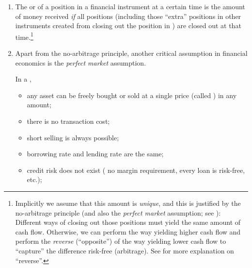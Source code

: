 \begin{enumerate}
\item The  or  of a position in a financial instrument
 at a certain time is the amount of money 
received \emph{if} all positions (including those ``extra'' positions in other
instruments created from closing out the position in ) are
closed out at that time.\footnote{Implicitly we assume that this amount is
\emph{unique}, and this is justified by the no-arbitrage principle (and also
the \emph{perfect market} assumption; see ):
Different ways of closing out those positions must yield the same amount of
cash flow.  Otherwise, we can perform the way yielding higher cash flow and
perform the \emph{reverse} (``opposite'') of the way yielding lower cash flow
to ``capture'' the difference risk-free (arbitrage). See 
for more explanation on ``reverse''.}


\item \label{it:perfect-mkt}
Apart from the no-arbitrage principle, another critical assumption in financial
economics is the \emph{perfect market} assumption.

In a ,
\begin{itemize}
\item any asset can be freely bought or sold at a single price (called
) in any amount;
\item there is no transaction cost;
\item short selling is always possible;
\item borrowing rate and lending rate are the same;
\item credit risk does not exist ( no margin requirement,
every loan is risk-free, etc.);
\end{itemize}


\end{enumerate}
